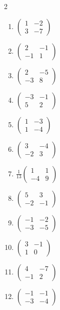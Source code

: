 \begin{multicols}{2}
\begin{enumerate}[label=\arabic*., leftmargin=*, itemsep=1pt]
\item $\left(\begin{smallmatrix}1 & -2\\ 3 & -7\end{smallmatrix}\right)$
\item $\left(\begin{smallmatrix}2 & -1\\ -1 & 1\end{smallmatrix}\right)$
\item $\left(\begin{smallmatrix}2 & -5\\ -3 & 8\end{smallmatrix}\right)$
\item $\left(\begin{smallmatrix}-3 & -1\\ 5 & 2\end{smallmatrix}\right)$
\item $\left(\begin{smallmatrix}1 & -3\\ 1 & -4\end{smallmatrix}\right)$
\item $\left(\begin{smallmatrix}3 & -4\\ -2 & 3\end{smallmatrix}\right)$
\item $\frac{1}{13}\left(\begin{smallmatrix}1 & 1\\ -4 & 9\end{smallmatrix}\right)$
\item $\left(\begin{smallmatrix}5 & 3\\ -2 & -1\end{smallmatrix}\right)$
\item $\left(\begin{smallmatrix}-1 & -2\\ -3 & -5\end{smallmatrix}\right)$
\item $\left(\begin{smallmatrix}3 & -1\\ 1 & 0\end{smallmatrix}\right)$
\item $\left(\begin{smallmatrix}4 & -7\\ -1 & 2\end{smallmatrix}\right)$
\item $\left(\begin{smallmatrix}-1 & -1\\ -3 & -4\end{smallmatrix}\right)$

\end{enumerate}
\end{multicols}
